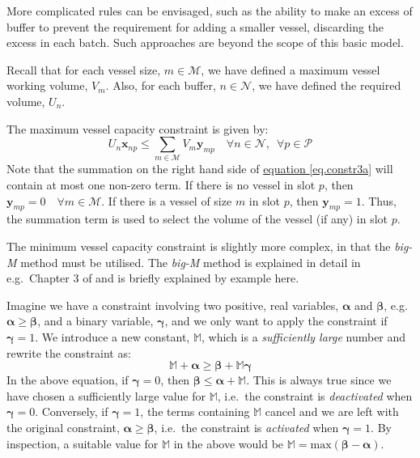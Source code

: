 More complicated rules can be envisaged, such as the ability to make an excess
of buffer to prevent the requirement for adding a smaller vessel, discarding
the excess in each batch.  Such approaches are beyond the scope of this basic
model.

Recall that for each vessel size, $m \in \mathcal{M}$, we have defined a
maximum vessel working volume, $V_{m}$.
Also, for each buffer, $n \in \mathcal{N}$, we have defined the required
volume, $U_{n}$.

The maximum vessel capacity constraint is given by:
\begin{equation}
    U_{n} \boldsymbol{x}_{np} \le \sum_{m \in \mathcal{M}} V_{m} 
    \boldsymbol{y}_{mp} \quad \forall n \in \mathcal{N}, \enspace \forall p 
    \in \mathcal{P}
    \label{eq.constr3a}
\end{equation}
Note that the summation on the right hand side of
\hyperref[eq.constr3a]{equation \ref*{eq.constr3a}} will contain at most one
non-zero term. If there is no vessel in slot $p$, then 
$\boldsymbol{y}_{mp} = 0 \quad \forall m \in \mathcal{M}$.
If there is a vessel of size $m$ in slot $p$, then $\boldsymbol{y}_{mp} = 1$.
Thus, the summation term is used to select the volume of the vessel (if any)
in slot $p$.

The minimum vessel capacity constraint is slightly more complex, in that the
\emph{big-M} method must be utilised.
The \emph{big-M} method is explained in detail in e.g.\ Chapter 3 of 
\citet{Taha:2017} and is briefly explained by example here.

Imagine we have a constraint involving two positive, real variables, 
$\boldsymbol{\alpha}$ and $\boldsymbol{\beta}$, e.g.\ 
$\boldsymbol{\alpha} \ge \boldsymbol{\beta}$, and a binary variable,
$\boldsymbol{\gamma}$, and we only want to apply the constraint if
$\boldsymbol{\gamma} = 1$.
We introduce a new constant, $\mathbb{M}$, which is a \emph{sufficiently large}
number and rewrite the constraint as:
\begin{equation}
    \mathbb{M} + \boldsymbol{\alpha} \ge \boldsymbol{\beta}+ \mathbb{M}
    \boldsymbol{\gamma}
\end{equation}
In the above equation, if $\boldsymbol{\gamma} = 0$, then 
$\boldsymbol{\beta} \le \boldsymbol{\alpha} + \mathbb{M}$.
This is always true since we have chosen a sufficiently large value for
$\mathbb{M}$, i.e.\ the constraint is \emph{deactivated} when
$\boldsymbol{\gamma} = 0$.
Conversely, if $\boldsymbol{\gamma} = 1$, the terms containing $\mathbb{M}$
cancel and we are left with the original constraint,
$\boldsymbol{\alpha} \ge \boldsymbol{\beta}$, i.e.\ the constraint is
\emph{activated} when $\boldsymbol{\gamma} = 1$.
By inspection, a suitable value for $\mathbb{M}$ in the above would be
$\mathbb{M} = \text{max} \left( \boldsymbol{\beta} - \boldsymbol{\alpha} 
 \right)$.

